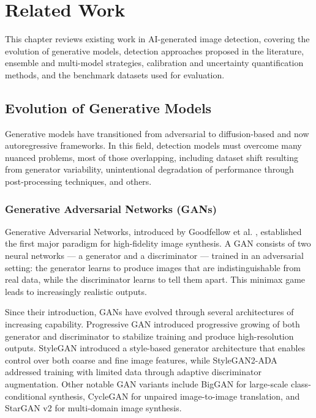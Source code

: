 
\chapter{Related Work}\label{chap:related}

This chapter reviews existing work in AI-generated image detection, covering the evolution of generative models, detection approaches proposed in the literature, ensemble and multi-model strategies, calibration and uncertainty quantification methods, and the benchmark datasets used for evaluation.


\section{Evolution of Generative Models}\label{sec:gen-models}

Generative models have transitioned from adversarial to diffusion-based and now autoregressive frameworks. In this field, detection models must overcome many nuanced problems, most of those overlapping, including dataset shift resulting from generator variability, unintentional degradation of performance through post-processing techniques, and others.

\subsection{Generative Adversarial Networks (GANs)}\label{sec:gans}

Generative Adversarial Networks, introduced by Goodfellow et al. \cite{goodfellow2014generative}, established the first major paradigm for high-fidelity image synthesis. A GAN consists of two neural networks --- a generator and a discriminator --- trained in an adversarial setting: the generator learns to produce images that are indistinguishable from real data, while the discriminator learns to tell them apart. This minimax game leads to increasingly realistic outputs.

Since their introduction, GANs have evolved through several architectures of increasing capability. Progressive GAN \cite{karras2018celeba} introduced progressive growing of both generator and discriminator to stabilize training and produce high-resolution outputs. StyleGAN \cite{karras2019ffhq} introduced a style-based generator architecture that enables control over both coarse and fine image features, while StyleGAN2-ADA \cite{karras2020metfaces} addressed training with limited data through adaptive discriminator augmentation. Other notable GAN variants include BigGAN \cite{brock2019biggan} for large-scale class-conditional synthesis, CycleGAN \cite{zhu2017cyclegan} for unpaired image-to-image translation, and StarGAN v2 \cite{choi2020starganv2} for multi-domain image synthesis.

